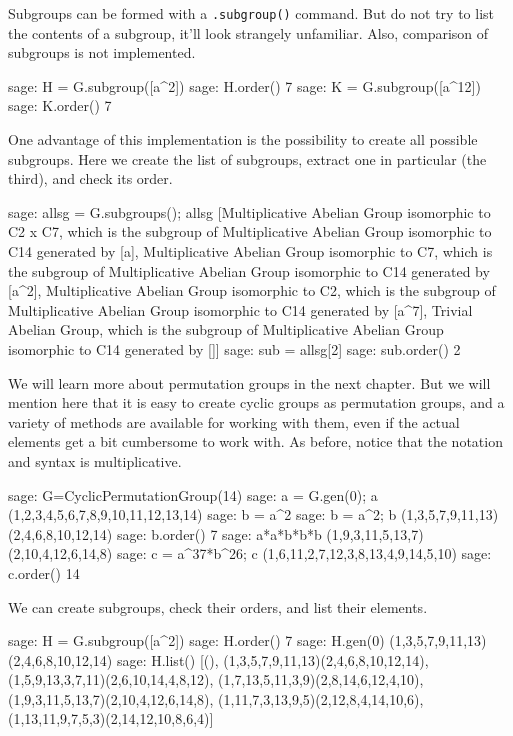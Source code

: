 %
Subgroups can be formed with a \verb?.subgroup()? command.  But do not try to list the contents of a subgroup, it'll look strangely unfamiliar.  Also, comparison of subgroups is not implemented.
%
\begin{sageexample}
sage: H = G.subgroup([a^2])
sage: H.order()
7
sage: K = G.subgroup([a^12])
sage: K.order()
7
\end{sageexample}
%
One advantage of this implementation is the possibility to create all possible subgroups.  Here we create the list of subgroups, extract one in particular (the third), and check its order.
%
\begin{sageexample}
sage: allsg = G.subgroups(); allsg
[Multiplicative Abelian Group isomorphic to C2 x C7,
 which is the subgroup of Multiplicative Abelian Group
 isomorphic to C14 generated by [a],
 Multiplicative Abelian Group isomorphic to C7,
 which is the subgroup of Multiplicative Abelian Group
 isomorphic to C14 generated by [a^2],
 Multiplicative Abelian Group isomorphic to C2,
 which is the subgroup of Multiplicative Abelian Group
 isomorphic to C14 generated by [a^7],
 Trivial Abelian Group,
 which is the subgroup of Multiplicative Abelian Group
 isomorphic to C14 generated by []]
sage: sub = allsg[2]
sage: sub.order()
2
\end{sageexample}
%
%
We will learn more about permutation groups in the next chapter.  But we will mention here that it is easy to create cyclic groups as permutation groups, and a variety of methods are available for working with them, even if the actual elements get a bit cumbersome to work with.  As before, notice that the notation and syntax is multiplicative.
%
\begin{sageexample}
sage: G=CyclicPermutationGroup(14)
sage: a = G.gen(0); a
(1,2,3,4,5,6,7,8,9,10,11,12,13,14)
sage: b = a^2
sage: b = a^2; b
(1,3,5,7,9,11,13)(2,4,6,8,10,12,14)
sage: b.order()
7
sage: a*a*b*b*b
(1,9,3,11,5,13,7)(2,10,4,12,6,14,8)
sage: c = a^37*b^26; c
(1,6,11,2,7,12,3,8,13,4,9,14,5,10)
sage: c.order()
14
\end{sageexample}
%
We can create subgroups, check their orders, and list their elements.
%
\begin{sageexample}
sage: H = G.subgroup([a^2])
sage: H.order()
7
sage: H.gen(0)
(1,3,5,7,9,11,13)(2,4,6,8,10,12,14)
sage: H.list()
[(),
 (1,3,5,7,9,11,13)(2,4,6,8,10,12,14),
 (1,5,9,13,3,7,11)(2,6,10,14,4,8,12),
 (1,7,13,5,11,3,9)(2,8,14,6,12,4,10),
 (1,9,3,11,5,13,7)(2,10,4,12,6,14,8),
 (1,11,7,3,13,9,5)(2,12,8,4,14,10,6),
 (1,13,11,9,7,5,3)(2,14,12,10,8,6,4)]
\end{sageexample}
